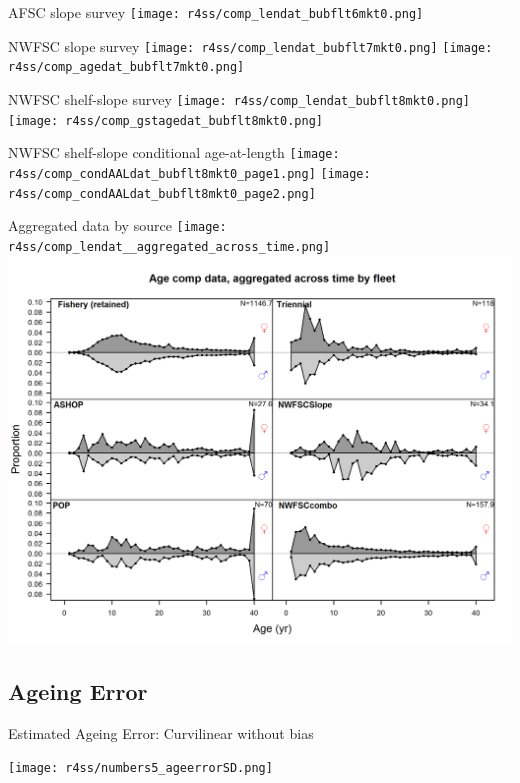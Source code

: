\documentclass[pdf]{beamer}\usepackage[]{graphicx}\usepackage[]{color}
\begin{document}
\begin{frame}{AFSC slope survey }
  \texttt{[image: r4ss/comp\_lendat\_bubflt6mkt0.png]}
  
\end{frame}

\begin{frame}{NWFSC slope survey }
    \texttt{[image: r4ss/comp\_lendat\_bubflt7mkt0.png]}
    \texttt{[image: r4ss/comp\_agedat\_bubflt7mkt0.png]}

\end{frame}

\begin{frame}{NWFSC shelf-slope survey }
  \texttt{[image: r4ss/comp\_lendat\_bubflt8mkt0.png]}
  \texttt{[image: r4ss/comp\_gstagedat\_bubflt8mkt0.png]}
\end{frame}


\begin{frame}{NWFSC shelf-slope conditional age-at-length}
    \texttt{[image: r4ss/comp\_condAALdat\_bubflt8mkt0\_page1.png]}
    \texttt{[image: r4ss/comp\_condAALdat\_bubflt8mkt0\_page2.png]}
\end{frame}


\begin{frame}{Aggregated data by source}
    \texttt{[image: r4ss/comp\_lendat\_\_aggregated\_across\_time.png]}
    \includegraphics[scale = 0.37]{figures/comp_agedat__aggregated_across_time.png}
\end{frame}


\subsection{Ageing Error}
\begin{frame}{Estimated Ageing Error: Curvilinear without bias}
  \begin{center}
    \texttt{[image: r4ss/numbers5\_ageerrorSD.png]}
  \end{center}
\end{frame}

  
  
  
\end{document}

